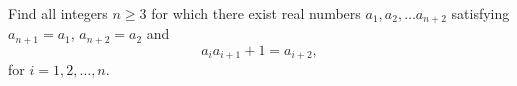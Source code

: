 Find all integers $n \geq 3$ for which there exist real numbers $a_1, a_2, \dots a_{n + 2}$ satisfying $a_{n + 1} = a_1$, $a_{n + 2} = a_2$ and
\[a_ia_{i + 1} + 1 = a_{i + 2},\]
for $i = 1, 2, \dots, n$.
